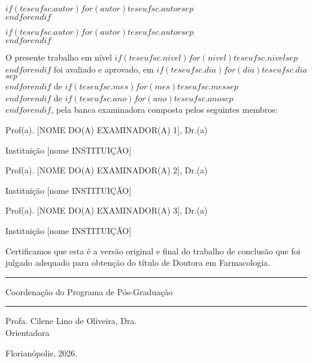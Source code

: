 \begin{center}

\vspace{1cm}

{$if(teseufsc.autor)$$for(autor)$$teseufsc.autor$$sep$ \\ $endfor$$endif$}

\vspace{1cm}

{$if(teseufsc.autor)$$for(autor)$$teseufsc.autor$$sep$ \\ $endfor$$endif$}

\vspace{1cm}

O presente trabalho em nível {$if(teseufsc.nivel)$$for(nivel)$$teseufsc.nivel$$sep$ \\ $endfor$$endif$} foi avaliado e aprovado, em {$if(teseufsc.dia)$$for(dia)$$teseufsc.dia$$sep$ \\ $endfor$$endif$} de {$if(teseufsc.mes)$$for(mes)$$teseufsc.mes$$sep$ \\ $endfor$$endif$} de {$if(teseufsc.ano)$$for(ano)$$teseufsc.ano$$sep$ \\ $endfor$$endif$}, pela banca examinadora composta pelos seguintes membros:

\vspace{1cm}

Prof(a). [NOME DO(A) EXAMINADOR(A) 1], Dr.(a)

Instituição [nome INSTITUIÇÃO]  

\vspace{1cm}

Prof(a). [NOME DO(A) EXAMINADOR(A) 2], Dr.(a)

Instituição [nome INSTITUIÇÃO]  

\vspace{1cm}

Prof(a). [NOME DO(A) EXAMINADOR(A) 3], Dr.(a)

Instituição [nome INSTITUIÇÃO]  

\vspace{1cm}

Certificamos que esta é a versão original e final do trabalho de conclusão que foi julgado adequado para obtenção do título de Doutora em Farmacologia.

\vspace{2cm}
\noindent\rule{0.6\textwidth}{0.4pt}

Coordenação do Programa de Pós-Graduação

\vspace{2cm}
\noindent\rule{0.6\textwidth}{0.4pt}

Profa. Cilene Lino de Oliveira, Dra.\\
Orientadora
\vfill

Florianópolis, 2026.
\end{center}

